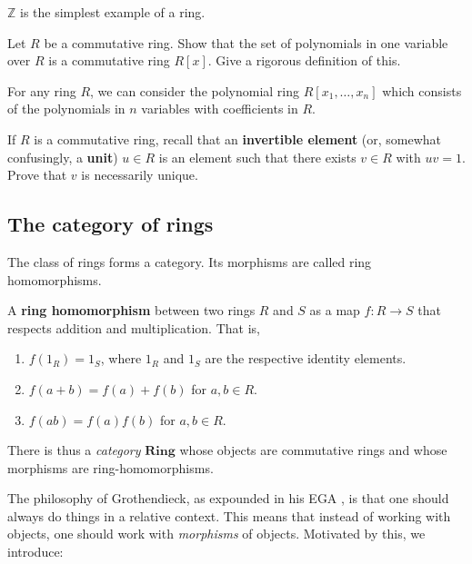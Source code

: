 \begin{example} 
$\mathbb{Z}$ is the simplest example of a ring.
\end{example} 

\begin{exercise}\label{polynomial} Let $R$ be a commutative ring.
Show that the set of polynomials in one variable over $R$ is a commutative
ring $R[x]$. Give a rigorous definition of this.
\end{exercise} 

\begin{example}
For any ring $R$, we can consider the polynomial ring $R[x_1, \ldots, x_n]$
which consists of the polynomials in $n$ variables with coefficients in $R$.
\end{example}


\begin{exercise} 
If $R$ is a commutative ring, recall that an \textbf{invertible element} (or, somewhat
confusingly, a \textbf{unit}) $u \in R$ is an element such
that there exists $v \in R$ with $uv = 1$. Prove that $v$ is necessarily
unique.
\end{exercise}

\subsection{The category of rings}
The class of rings forms a category. Its morphisms are called ring homomorphisms.


\begin{definition}
A \textbf{ring homomorphism} between two rings $R$ and $S$ as a map
$f : R \to S$ that respects addition and multiplication. That is,

\begin{enumerate}
  \item $f(1_R) = 1_S$, where $1_R$ and $1_S$ are the respective identity
        elements.
  \item $f(a + b) = f(a) + f(b)$ for $a, b \in R$.
  \item $f(ab) = f(a)f(b)$ for $a, b \in R$.
\end{enumerate}
There is thus a \emph{category} $\mathbf{Ring}$ whose objects are commutative
rings and whose morphisms are ring-homomorphisms.
\end{definition}

The philosophy of Grothendieck, as expounded in his EGA \cite{EGA}, is that one should
always do things in a relative context. This means that instead of working
with objects, one should work with \emph{morphisms} of objects. Motivated by
this, we introduce:

